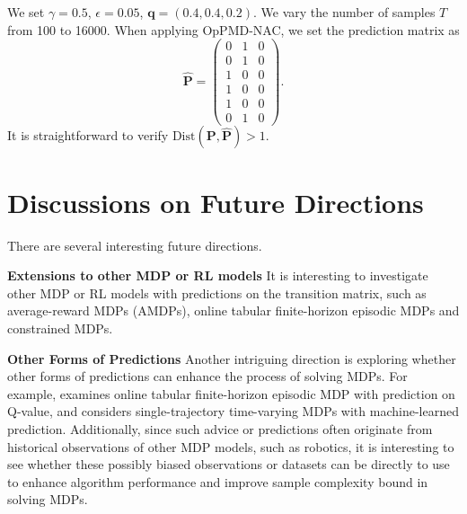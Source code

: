 \documentclass[12pt]{article}
\begin{document}
We set $\gamma = 0.5$, $\epsilon = 0.05$, $\boldsymbol{q} = (0.4,0.4,0.2)$. We vary the number of samples $T$ from 100 to 16000. When applying OpPMD-NAC, we set the prediction matrix as
\begin{equation*}
    \hat{\boldsymbol{\text{P}}} = \begin{pmatrix}
        0 & 1 & 0 \\
        0 & 1 & 0 \\
        1 & 0 & 0 \\
        1 & 0 & 0\\
        1 & 0 & 0 \\
        0 & 1 & 0
    \end{pmatrix}.
\end{equation*}
It is straightforward to verify $\text{Dist}(\boldsymbol{\text{P}},\hat{\boldsymbol{\text{P}}}) > 1$.



\section{Discussions on Future Directions}

\label{sec:app-discussions-future}

There are several interesting future directions.

\textbf{Extensions to other MDP or RL models} It is interesting to investigate other MDP or RL models with predictions on the transition matrix, such as average-reward MDPs (AMDPs), online tabular finite-horizon episodic MDPs and constrained MDPs. 

\textbf{Other Forms of Predictions} Another intriguing direction is exploring whether other forms of predictions can enhance the process of solving MDPs. For example, \cite{golowich2022can} examines online tabular finite-horizon episodic MDP with prediction on Q-value, and \cite{li2024beyond} considers single-trajectory time-varying MDPs with machine-learned prediction. Additionally, since such advice or predictions often originate from historical observations of other MDP models, such as robotics, it is interesting to see whether these possibly biased observations or datasets can be directly to use to enhance algorithm performance and improve sample complexity bound in solving MDPs.
\end{document}
